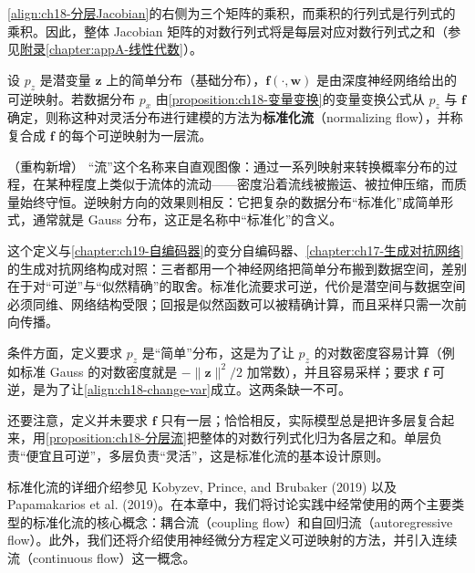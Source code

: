 \documentclass[../main.tex]{subfiles}
\begin{document}
\eqref{align:ch18-分层Jacobian}的右侧为三个矩阵的乘积，而乘积的行列式是行列式的乘积。因此，整体 Jacobian 矩阵的对数行列式将是每层对应对数行列式之和（参见\hyperref[chapter:appA-线性代数]{附录\ref*{chapter:appA-线性代数}}）。

\begin{definition}[标准化流]\label{definition:ch18-标准化流}
设 $p_z$ 是潜变量 $\bm{z}$ 上的简单分布（基础分布），$\bm{f}(\cdot,\bm{w})$ 是由深度神经网络给出的可逆映射。若数据分布 $p_x$ 由\cref{proposition:ch18-变量变换}的变量变换公式从 $p_z$ 与 $\bm{f}$ 确定，则称这种对灵活分布进行建模的方法为\textbf{标准化流}（normalizing flow），并称复合成 $\bm{f}$ 的每个可逆映射为一层流。
\end{definition}

\begin{remark}（重构新增）
“流”这个名称来自直观图像：通过一系列映射来转换概率分布的过程，在某种程度上类似于流体的流动——密度沿着流线被搬运、被拉伸压缩，而质量始终守恒。逆映射方向的效果则相反：它把复杂的数据分布“标准化”成简单形式，通常就是 Gauss 分布，这正是名称中“标准化”的含义。

这个定义与\cref{chapter:ch19-自编码器}的变分自编码器、\cref{chapter:ch17-生成对抗网络}的生成对抗网络构成对照：三者都用一个神经网络把简单分布搬到数据空间，差别在于对“可逆”与“似然精确”的取舍。标准化流要求可逆，代价是潜空间与数据空间必须同维、网络结构受限；回报是似然函数可以被精确计算，而且采样只需一次前向传播。

条件方面，定义要求 $p_z$ 是“简单”分布，这是为了让 $p_z$ 的对数密度容易计算（例如标准 Gauss 的对数密度就是 $-\|\bm{z}\|^{2}/2$ 加常数），并且容易采样；要求 $\bm{f}$ 可逆，是为了让\eqref{align:ch18-change-var}成立。这两条缺一不可。

还要注意，定义并未要求 $\bm{f}$ 只有一层；恰恰相反，实际模型总是把许多层复合起来，用\cref{proposition:ch18-分层流}把整体的对数行列式化归为各层之和。单层负责“便宜且可逆”，多层负责“灵活”，这是标准化流的基本设计原则。
\end{remark}

标准化流的详细介绍参见 Kobyzev, Prince, and Brubaker (2019) 以及 Papamakarios et al. (2019)。在本章中，我们将讨论实践中经常使用的两个主要类型的标准化流的核心概念：耦合流（coupling flow）和自回归流（autoregressive flow）。此外，我们还将介绍使用神经微分方程定义可逆映射的方法，并引入连续流（continuous flow）这一概念。






\end{document}
